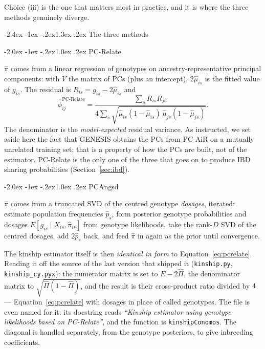 \documentclass[10pt,a4paper]{article}
\makeatletter
\renewcommand\section{\@startsection{section}{1}{\z@}%
  {-2.4ex \@plus -1ex \@minus -.2ex}{1.3ex \@plus.2ex}%
  {\normalfont\large\bfseries\color{hdr}}}
\renewcommand\subsection{\@startsection{subsection}{2}{\z@}%
  {-2.0ex \@plus -1ex \@minus -.2ex}{1.0ex \@plus.2ex}%
  {\normalfont\normalsize\bfseries\color{hdr}}}
\makeatother
\begin{document}
\noindent
Choice (iii) is the one that matters most in practice, and it is where the three methods genuinely diverge.

\section{The three methods}

\subsection{PC-Relate}

$\hat\pi$ comes from a linear regression of genotypes on ancestry-representative principal components: with
$V$ the matrix of PCs (plus an intercept), $2\hat\mu_{is}$ is the fitted value of $g_{is}$.
The residual is $R_{is}=g_{is}-2\hat\mu_{is}$ and
\begin{equation}
\hat\phi^{\text{PC-Relate}}_{ij}
=\frac{\sum_s R_{is}R_{js}}
{4\sum_s \sqrt{\hat\mu_{is}(1-\hat\mu_{is})\,\hat\mu_{js}(1-\hat\mu_{js})}} .
\label{eq:pcrelate}
\end{equation}
The denominator is the \emph{model-expected} residual variance. As instructed, we set aside here the fact
that GENESIS obtains the PCs from PC-AiR on a mutually unrelated training set; that is a property of how the
PCs are built, not of the estimator. PC-Relate is the only one of the three that goes on to produce IBD
sharing probabilities (Section~\ref{sec:ibd}).

\subsection{PCAngsd}

$\hat\pi$ comes from a truncated SVD of the centred genotype \emph{dosages}, iterated: estimate population
frequencies $\hat p_s$, form posterior genotype probabilities and dosages
$E[g_{is}\mid X_{is},\hat\pi_{is}]$ from genotype likelihoods, take the rank-$D$ SVD of the centred dosages,
add $2\hat p_s$ back, and feed $\hat\pi$ in again as the prior until convergence.

The kinship estimator itself is then \emph{identical in form} to
Equation~\eqref{eq:pcrelate}. Reading it off the source of the last version that shipped it
(\texttt{kinship.py}, \texttt{kinship\_cy.pyx}): the numerator matrix is set to $E-2\hat\Pi$, the denominator
matrix to $\sqrt{\hat\Pi(1-\hat\Pi)}$, and the result is their cross-product ratio divided by $4$ ---
Equation~\eqref{eq:pcrelate} with dosages in place of called genotypes. The file is even named for it: its
docstring reads \emph{``Kinship estimator using genotype likelihoods based on PC-Relate''}, and the function
is \texttt{kinshipConomos}. The diagonal is handled separately, from the genotype posteriors, to give
inbreeding coefficients.
\end{document}
